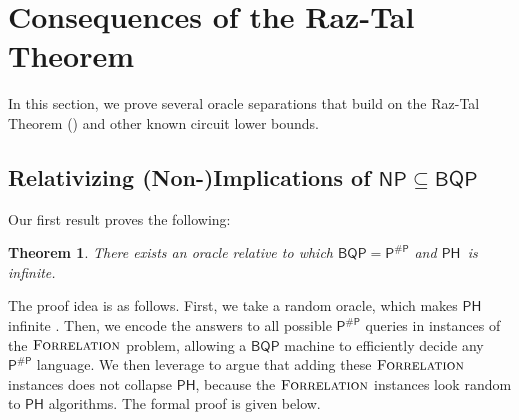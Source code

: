 \documentclass[11pt]{article}%
\newtheorem{theorem}{Theorem}
\newcommand{\Forrelation}{\normalfont\textsc{Forrelation}}
\begin{document}
\section{Consequences of the Raz-Tal Theorem}

In this section, we prove several oracle separations that build on the Raz-Tal Theorem () and other known circuit lower bounds.

\subsection{Relativizing (Non-)Implications of \texorpdfstring{$\mathsf{NP}\subseteq\mathsf{BQP}$}{NP in BQP}}

Our first result proves the following:

\begin{theorem}
\label{thm:bqp=pp_ph_infinite}
There exists an oracle relative to which $\mathsf{BQP} = \mathsf{P^{\# P}}$ and $\mathsf{PH}$\ is infinite.
\end{theorem}

The proof idea is as follows. First, we take a random oracle, which makes $\mathsf{PH}$ infinite \cite{HRST17,RST15}. Then, we encode the answers to all possible $\mathsf{P^{\# P}}$ queries in instances of the $\Forrelation$ problem, allowing a $\mathsf{BQP}$ machine to efficiently decide any $\mathsf{P^{\# P}}$ language. We then leverage  to argue that adding these $\Forrelation$ instances does not collapse $\mathsf{PH}$, because the $\Forrelation$ instances look random to $\mathsf{PH}$ algorithms. The formal proof is given below.
\end{document}

